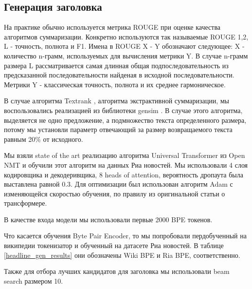 \documentclass[14pt]{matmex-diploma-custom}
\begin{document}
\subsection{Генерация заголовка}
На практике обычно используется метрика ROUGE \cite{Lin:2004} при оценке качества алгоритмов суммаризации. Конкретно используются так называемые ROUGE 1,2, L - точность, полнота и F1. Имена в ROUGE X - Y обозначают следующее: X - количество n-грамм, используемых для вычисления метрики Y. В случае n-грамм размера L рассматривается самая длинная общая подпоследовательность из предсказанной последовательности найденая в исходной последовательности. Метрики Y - классическая точность, полнота и их среднее гармоническое.

В случае алгоритма Textrank \cite{DBLP:journals/corr/BarriosLAW16}, алгоритма экстрактивной суммаризации, мы воспользовались реализацией из библиотеки gensim \cite{rehurek_lrec}. В случае этого алгоритма, выделяется не одно предложение, а подмножество текста определенного размера, потому мы установли параметр отвечающий за размер возвращаемого текста равным 20\% от исходного.

Мы взяли state of the art реализацию алгоритма Universal Transformer из Open NMT \cite{2017opennmt} и обучили этот алгоритм на данных Риа новостей. Мы использовали 4 слоя кодировщика и декодеривщика, 8 heads of attention, вероятность дропаута была выставлена равной 0.3. Для оптимизации был использован алгоритм Adam с изменяющейся скоростью обучения, по правилу из оригинальной статьи о трансформере.

В качестве входа модели мы использовали первые 2000 BPE токенов.

Что касается обучения Byte Pair Encoder, то мы попробовали пердобученный на википедии токенизатор и обученный на датасете Риа новостей. В таблице \ref{headline_gen_results} они обозначены Wiki BPE и Ria BPE, соответственно.

Также для отбора лучших кандидатов для заголовка мы использовали beam search размером 10.
\end{document}
